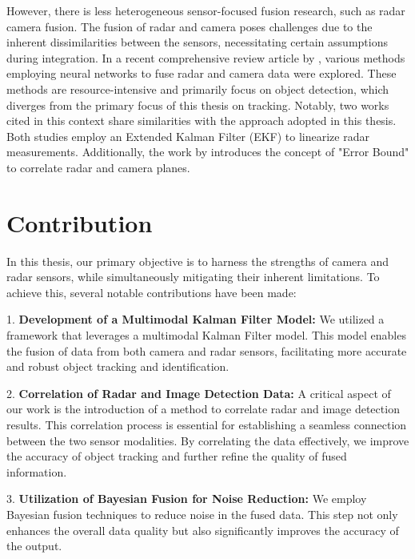 However, there is less heterogeneous sensor-focused fusion research, such as radar camera fusion.
The fusion of radar and camera poses challenges due to the inherent dissimilarities between the sensors, necessitating certain assumptions during integration.
In a recent comprehensive review article by \citeauthor{Yao_2023}\cite{Yao_2023}, 
various methods employing neural networks to fuse radar and camera data were explored.
These methods are resource-intensive and primarily focus on object detection, 
which diverges from the primary focus of this thesis on tracking. 
Notably, two works cited in this context \cite{8932892}\cite{8844649} share similarities with the approach adopted in this thesis. 
Both studies employ an Extended Kalman Filter (EKF) to linearize radar measurements. 
Additionally, the work by \citeauthor{8844649} introduces the concept of "Error Bound" to correlate radar and camera planes.

\newpage

\section{Contribution}\label{sec:1-contribution}


In this thesis, our primary objective is to harness the strengths of camera and radar sensors, 
while simultaneously mitigating their inherent limitations. To achieve this, several notable contributions have been made:

1. \textbf{Development of a Multimodal Kalman Filter Model: }
We utilized a framework that leverages a multimodal Kalman Filter model. 
This model enables the fusion of data from both camera and radar sensors, 
facilitating more accurate and robust object tracking and identification. 

2. \textbf{Correlation of Radar and Image Detection Data: }
A critical aspect of our work is the introduction of a method to correlate radar and image detection results. 
This correlation process is essential for establishing a seamless connection between the two sensor modalities.
By correlating the data effectively, we improve the accuracy of object tracking and further refine the quality of fused information.

3. \textbf{Utilization of Bayesian Fusion for Noise Reduction: }
We employ Bayesian fusion techniques to reduce noise in the fused data.
This step not only enhances the overall data quality but also significantly improves the accuracy of the output. 

